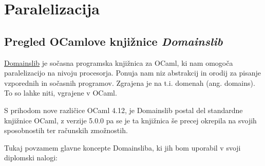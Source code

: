 \documentclass[mat1, tisk]{fmfdelo}
\begin{document}
\section{Paralelizacija}

\subsection{Pregled OCamlove knjižnice \textit{Domainslib}} \label{sec:pregled_domainslib}

\href{https://github.com/ocaml-multicore/domainslib}{Domainslib} je sočasna programska knjižnica za OCaml, 
ki nam omogoča paralelizacijo na nivoju procesorja.
Ponuja nam niz abstrakcij in orodij za pisanje vzporednih in sočasnih programov. 
Zgrajena je na t.i. domenah (ang. domains). To so lahke niti, vgrajene v OCaml.

S prihodom nove različice OCaml 4.12, je Domainslib postal del standardne knjižnice OCaml, z verzije 5.0.0 pa se je ta knjižnica
še precej okrepila na svojih sposobnostih ter računskih zmožnostih.

Tukaj povzamem glavne koncepte Domainsliba, ki jih bom uporabil v svoji diplomski nalogi:
\end{document}
